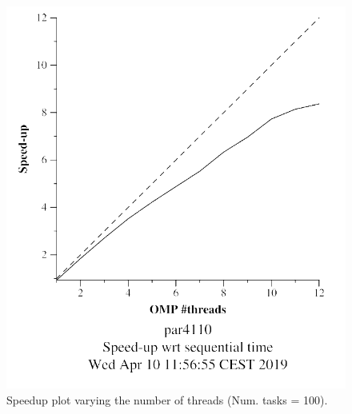 \documentclass[12pt, a4paper]{article}
\begin{document}
\begin{figure}[H]
\begin{minipage}[b]{0.4\linewidth}
  \includegraphics[scale=0.5]{./mandel-omp-10000-strong-omp-3-100-speedup}
  \caption{Speedup plot varying the number of threads (Num. tasks = 100).}
  \label{fig:mandel-omp-10000-strong-omp-3-100-speedup}
\end{minipage}
\end{figure}
\end{document}

